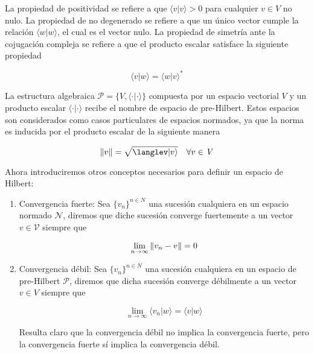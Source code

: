 La propiedad de positividad se refiere a que $\langle v | v \rangle > 0$ para cualquier $v \in \mathit{V}$ no nulo. La propiedad de no degenerado se refiere a que un único vector cumple la relación $\langle w | w \rangle$, el cual es el vector nulo. La propiedad de simetría ante la cojugación compleja se refiere a que el producto escalar satisface la siguiente propiedad

\begin{equation}
    \langle v | w \rangle = \langle w | v \rangle^*
\end{equation}

La estructura algebraica $\mathcal{P} = \{\mathit{V}, \langle \cdot | \cdot \rangle\}$ compuesta por un espacio vectorial $\mathit{V}$ y un producto escalar $\langle \cdot | \cdot \rangle$ recibe el nombre de espacio de pre-Hilbert. Estos espacios son considerados como casos particulares de espacios normados, ya que la norma es inducida por el producto escalar de la siguiente manera

\begin{equation}
    \norm{v} = \sqrt{\langlev | v \rangle} \quad \forall v \in \mathit{V}
\end{equation}

Ahora introduciremos otros conceptos necesarios para definir un espacio de Hilbert:

\begin{enumerate}
    \item Convergencia fuerte: Sea $\{v_n\}^{n \in N}$ una sucesión cualquiera en un espacio normado $\mathcal{N}$, diremos que diche sucesión converge fuertemente a un vector $v \in \mathcal{V}$ siempre que

        \begin{equation}
            \lim_{n \to \infty} \norm{v_n - v} = 0
        \end{equation}

    \item Convergencia débil: Sea $\{v_n\}^{n \in N}$ una sucesión cualquiera en un espacio de pre-Hilbert $\mathcal{P}$, diremos que dicha sucesión converge débilmente a un vector $v \in \mathit{V}$ siempre que

        \begin{equation}
            \lim_{n \to \infty} \langle v_n | w \rangle = \langle v | w \rangle
        \end{equation}

        Resulta  claro que la convergencia débil no implica la convergencia fuerte, pero la convergencia fuerte sí implica la convergencia débil.
\end{enumerate}


